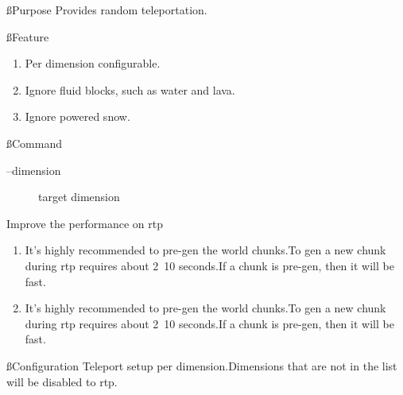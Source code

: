 
\ss{Purpose}
Provides random teleportation.

\ss{Feature}
\begin{enumerate}
    \item Per dimension configurable.
    \item Ignore fluid blocks, such as water and lava.
    \item Ignore powered snow.
\end{enumerate}

\ss{Command}
\begin{description}
    \item [--dimension] target dimension
\end{description}

\begin{tips}{Improve the performance on rtp}
    \begin{enumerate}
        \item It's highly recommended to pre-gen the world chunks.To gen a new chunk during rtp requires about 2~10 seconds.If a chunk is pre-gen, then it will be fast.
        \item It's highly recommended to pre-gen the world chunks.To gen a new chunk during rtp requires about 2~10 seconds.If a chunk is pre-gen, then it will be fast.
    \end{enumerate}
\end{tips}

\ss{Configuration}
Teleport setup per dimension.Dimensions that are not in the list will be disabled to rtp.




